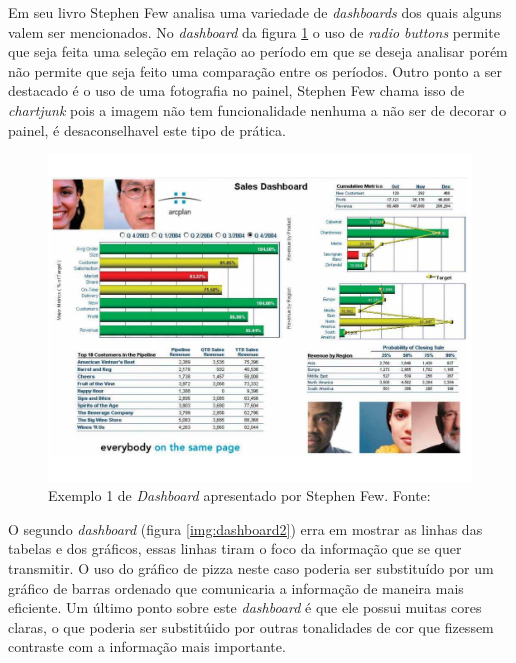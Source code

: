 Em seu livro Stephen Few \cite{book_design} analisa uma variedade de \textit{dashboards} dos quais alguns valem ser mencionados. No \textit{dashboard} da figura \ref{img:dashboard1} o uso de \textit{radio buttons} permite que seja feita uma seleção em relação ao período em que se deseja analisar porém não permite que seja feito uma comparação entre os períodos. Outro ponto a ser destacado é o uso de uma fotografia no painel, Stephen Few chama isso de \textit{chartjunk} pois a imagem não tem funcionalidade nenhuma a não ser de decorar o painel, é desaconselhavel este tipo de prática.
\graphicspath{{figuras/}}
\begin{figure}[]
\centering
\includegraphics[scale=0.50]{dashboard1}
\caption{Exemplo 1 de \textit{Dashboard} apresentado por Stephen Few. Fonte: \cite{book_design}}
\label{img:dashboard1}
\end{figure}
O segundo \textit{dashboard} (figura \ref{img:dashboard2}) erra em mostrar as linhas das tabelas e dos gráficos, essas linhas tiram o foco da informação que se quer transmitir. O uso do gráfico de pizza neste caso poderia ser substituído por um gráfico de barras ordenado que comunicaria a informação de maneira mais eficiente. Um último ponto sobre este \textit{dashboard} é que ele possui muitas cores claras, o que poderia ser substitúido por outras tonalidades de cor que fizessem contraste com a informação mais importante.
\graphicspath{{figuras/}}
